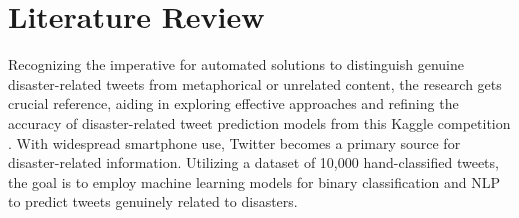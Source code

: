 \chapter{Literature Review}
\label{ch:lit_rev} %
Recognizing the imperative for automated solutions to distinguish genuine disaster-related 
tweets from metaphorical or unrelated content, the research gets crucial reference, aiding in 
exploring effective approaches and refining the accuracy of disaster-related tweet prediction 
models from this Kaggle competition \cite{nlp-getting-started} \cite{nlp-getting-started2}. 
With widespread smartphone use, Twitter becomes a primary source for disaster-related 
information. Utilizing a dataset of 10,000 hand-classified tweets, the goal is to employ 
machine learning models for binary classification and NLP to predict tweets genuinely related 
to disasters. 

